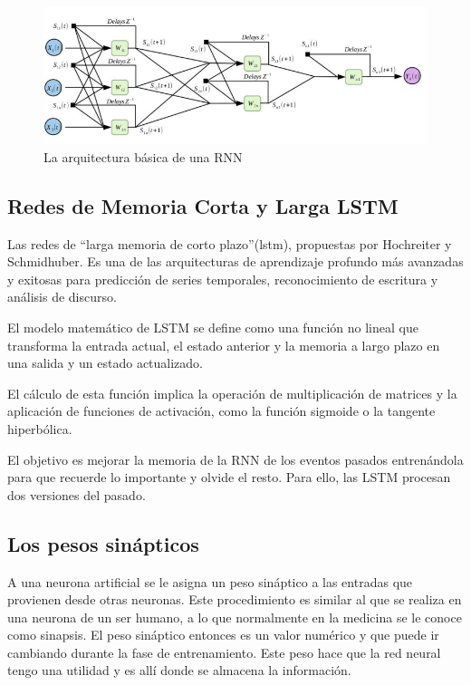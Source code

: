 \begin{figure}[H]
  \begin{center}
    \includegraphics[scale=0.70]{./redes_recurrentes.png}
    \caption{La arquitectura básica de una RNN}
    \label{fig:red_recurreente}
  \end{center}
\end{figure}

 
\subsection{Redes de Memoria Corta y Larga  LSTM}

Las redes de “larga memoria de corto plazo”(\gls{lstm}), propuestas por Hochreiter y Schmidhuber. Es una de las arquitecturas de aprendizaje profundo más avanzadas y exitosas para predicción de series temporales, reconocimiento de escritura y análisis de discurso\cite{fernandez2021estimacion}.

El modelo matemático de LSTM se define como una función no lineal que transforma la entrada actual, el estado anterior y la memoria a largo plazo en una salida y un estado actualizado.

El cálculo de esta función implica la  operación  de  multiplicación  de  matrices  y  la  aplicación  de  funciones  de  activación,  como la función sigmoide o la tangente hiperbólica\cite{tomas2023prediccion}.

El objetivo es mejorar la memoria de la RNN de los eventos pasados entrenándola para que recuerde lo importante y olvide el resto. Para ello, las LSTM procesan dos versiones del pasado\cite{arana2021redes}.
\subsection{Los pesos sinápticos}
A una neurona artificial se le asigna un peso sináptico a las entradas que provienen desde otras neuronas. Este procedimiento es similar al que se realiza en una neurona de un ser humano, a lo que normalmente en la medicina se le conoce como sinapsis. El peso sináptico entonces es un valor numérico y que puede ir cambiando durante la fase de entrenamiento\cite{acevedo2017principios}. Este peso hace que la red neural tengo una utilidad y es allí donde se almacena la información.

